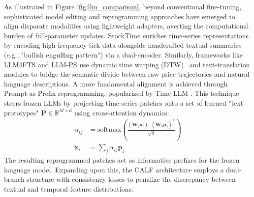 As illustrated in Figure \ref{fig:llm_comparison}, beyond conventional fine-tuning, sophisticated model editing and reprogramming approaches have emerged to align disparate modalities using lightweight adapters, averting the computational burden of full-parameter updates. StockTime \citep{wang2024stocktime} enriches time-series representations by encoding high-frequency tick data alongside handcrafted textual summaries (e.g., "bullish engulfing pattern") via a dual-encoder. Similarly, frameworks like LLM4FTS \citep{liu2025llm4fts} and LLM-PS \citep{tang2025llmps} use dynamic time warping (DTW)~\citep{sakoe1978dynamic} and text-translation modules to bridge the semantic divide between raw price trajectories and natural language descriptions. A more fundamental alignment is achieved through Prompt-as-Prefix reprogramming, popularized by Time-LLM \citep{jin2024timellm}. This technique steers frozen LLMs by projecting time-series patches onto a set of learned "text prototypes" $\mathbf{P} \in \mathbb{R}^{M \times d}$ using cross-attention dynamics:
\begin{align}
\alpha_{ij} &= \text{softmax} \left(\frac{(\mathbf{W}_q \mathbf{x}_i) \cdot (\mathbf{W}_k \mathbf{p}_j)^\top}{\sqrt{d}}\right) \\
\tilde{\mathbf{x}}_i &= \sum_j \alpha_{ij} \mathbf{p}_j
\end{align}
The resulting reprogrammed patches act as informative prefixes for the frozen language model. Expanding upon this, the CALF architecture \citep{liu2025calf} employs a dual-branch structure with consistency losses to penalize the discrepancy between textual and temporal feature distributions.

